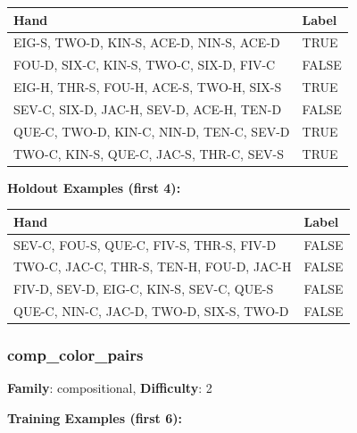 \documentclass[10pt,a4paper]{article}
\begin{document}
\begin{small}
\begin{tabular}{p{8cm}l}
\toprule
Hand & Label \\
\midrule
EIG-S, TWO-D, KIN-S, ACE-D, NIN-S, ACE-D & \textcolor{positive}{TRUE} \\
FOU-D, SIX-C, KIN-S, TWO-C, SIX-D, FIV-C & \textcolor{negative}{FALSE} \\
EIG-H, THR-S, FOU-H, ACE-S, TWO-H, SIX-S & \textcolor{positive}{TRUE} \\
SEV-C, SIX-D, JAC-H, SEV-D, ACE-H, TEN-D & \textcolor{negative}{FALSE} \\
QUE-C, TWO-D, KIN-C, NIN-D, TEN-C, SEV-D & \textcolor{positive}{TRUE} \\
TWO-C, KIN-S, QUE-C, JAC-S, THR-C, SEV-S & \textcolor{positive}{TRUE} \\
\bottomrule
\end{tabular}
\end{small}

\textbf{Holdout Examples (first 4):}

\begin{small}
\begin{tabular}{p{8cm}l}
\toprule
Hand & Label \\
\midrule
SEV-C, FOU-S, QUE-C, FIV-S, THR-S, FIV-D & \textcolor{negative}{FALSE} \\
TWO-C, JAC-C, THR-S, TEN-H, FOU-D, JAC-H & \textcolor{negative}{FALSE} \\
FIV-D, SEV-D, EIG-C, KIN-S, SEV-C, QUE-S & \textcolor{negative}{FALSE} \\
QUE-C, NIN-C, JAC-D, TWO-D, SIX-S, TWO-D & \textcolor{negative}{FALSE} \\
\bottomrule
\end{tabular}
\end{small}

\vspace{0.5cm}

\subsubsection{comp\_color\_pairs}

\textbf{Family}: compositional, \textbf{Difficulty}: 2

\textbf{Training Examples (first 6):}
\end{document}
